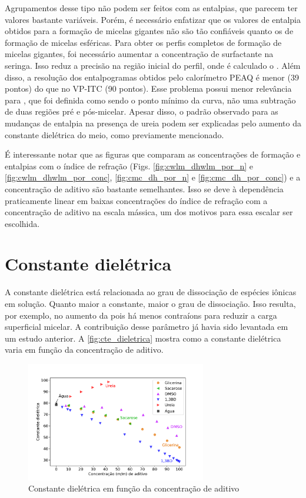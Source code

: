 		Agrupamentos desse tipo não podem ser feitos com as entalpias, que parecem ter valores bastante variáveis. Porém, é necessário enfatizar que os valores de entalpia obtidos para a formação de micelas gigantes não são tão confiáveis quanto os de formação de micelas esféricas. Para obter os perfis completos de formação de micelas gigantes, foi necessário aumentar a concentração de surfactante na seringa. Isso reduz a precisão na região inicial do perfil, onde é calculado o \DHwlm. Além disso, a resolução dos entalpogramas obtidos pelo calorímetro PEAQ é menor (39 pontos) do que no VP-ITC (90 pontos). Esse problema possui menor relevância para \cwlm{}, que foi definida como sendo o ponto mínimo da curva, não uma subtração de duas regiões pré e pós-micelar.  Apesar disso, o padrão observado para as mudanças de entalpia na presença de ureia podem ser explicadas pelo aumento da constante dielétrica do meio, como previamente mencionado.
	
		É interessante notar que as figuras que comparam as concentrações de formação e entalpias com o índice de refração (Figs. \ref{fig:cwlm_dhwlm_por_n} e \ref{fig:cwlm_dhwlm_por_conc}, \ref{fig:cmc_dh_por_n} e \ref{fig:cmc_dh_por_conc}) e a concentração de aditivo são bastante semelhantes. Isso se deve à dependência praticamente linear em baixas concentrações do índice de refração com a concentração de aditivo na escala mássica, um dos motivos para essa escalar ser escolhida.
		
		\FloatBarrier
		
		\section{Constante dielétrica}
		
		A constante dielétrica está relacionada ao grau de dissociação de espécies iônicas em solução. Quanto maior a constante, maior o grau de dissociação. Isso resulta, por exemplo, no aumento da \cmc{} pois há menos contraíons para reduzir a carga superficial micelar. A contribuição desse parâmetro já havia sido levantada em um estudo anterior. %
		A \autoref{fig:cte_dieletrica} mostra como a constante dielétrica varia em função da concentração de aditivo. %

		
		\begin{figure}[h]
			\centering
			\includegraphics[width=0.7\textwidth]{imagens/propriedades/cte_dieletrica}
			\caption{Constante dielétrica em função da concentração de aditivo}  %
			\label{fig:cte_dieletrica}
		\end{figure}
	
